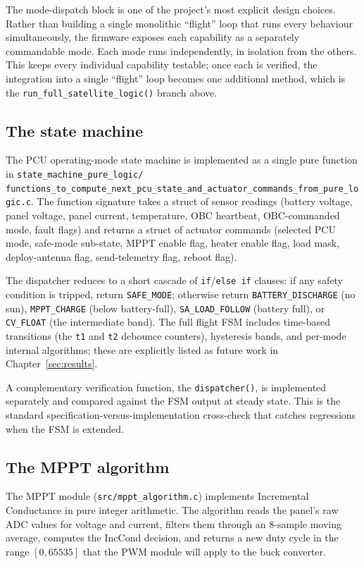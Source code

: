 The mode-dispatch block is one of the project's most explicit
design choices. Rather than building a single monolithic
``flight'' loop that runs every behaviour simultaneously, the
firmware exposes each capability as a separately commandable mode.
Each mode runs independently, in isolation from the others. This
keeps every individual capability testable; once each is verified,
the integration into a single ``flight'' loop becomes one
additional method, which is the
\texttt{run\_full\_satellite\_logic()} branch above.

\subsection{The state machine}

The PCU operating-mode state machine is implemented as a single
pure function in
\texttt{state\_machine\_pure\_logic/}\\
\texttt{functions\_to\_compute\_next\_pcu\_state\_and\_actuator\_commands\_from\_pure\_logic.c}.
The function signature takes a struct of sensor readings (battery
voltage, panel voltage, panel current, temperature, OBC heartbeat,
OBC-commanded mode, fault flags) and returns a struct of actuator
commands (selected PCU mode, safe-mode sub-state, MPPT enable
flag, heater enable flag, load mask, deploy-antenna flag,
send-telemetry flag, reboot flag).

The dispatcher reduces to a short cascade of \texttt{if}/\texttt{else
if} clauses: if any safety condition is tripped, return
\texttt{SAFE\_MODE}; otherwise return
\texttt{BATTERY\_DISCHARGE} (no sun), \texttt{MPPT\_CHARGE}
(below battery-full), \texttt{SA\_LOAD\_FOLLOW} (battery full),
or \texttt{CV\_FLOAT} (the intermediate band). The full flight FSM
includes time-based transitions (the \texttt{t1} and \texttt{t2}
debounce counters), hysteresis bands, and per-mode internal
algorithms; these are explicitly listed as future work in
Chapter~\ref{sec:results}.

A complementary verification function, the \texttt{dispatcher()},
is implemented separately and compared against the FSM output at
steady state. This is the standard
specification-versus-implementation cross-check that catches
regressions when the FSM is extended.

\subsection{The MPPT algorithm}

The MPPT module
(\texttt{src/mppt\_algorithm.c}) implements Incremental Conductance
in pure integer arithmetic. The algorithm reads the panel's raw
ADC values for voltage and current, filters them through an
8-sample moving average, computes the IncCond decision, and
returns a new duty cycle in the range $[0, 65535]$ that the PWM
module will apply to the buck converter.

